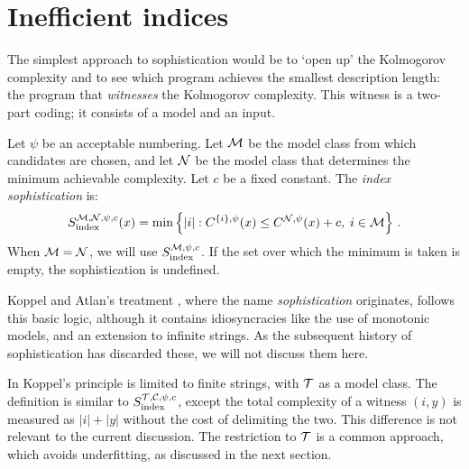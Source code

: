 \section{Inefficient indices}
\label{section:indices}

The simplest approach to sophistication would be to `open up' the Kolmogorov complexity and to see which program achieves the smallest description length: the program that \emph{witnesses} the Kolmogorov complexity. This witness is a two-part coding; it consists of a model and an input.


\begin{definition}
Let $\psi$ be an acceptable numbering. Let ${\cal M}$ be the model class from which candidates are chosen, and let ${\cal N}$ be the model class that determines the minimum achievable complexity. Let $c$ be a fixed constant. The \emph{index sophistication} is:
\[
S_{\textnormal{index}}^{{\cal M},{\cal N},\psi,c}(x) = \min\left\{ |i| : C^{\{i\}, \psi}(x) \leq C^{{\cal N}, \psi}(x)+c,\;i \in {\cal M}\right\} \,\text{.}
\]
When ${\cal M} = {\cal N}$, we will use $S_{\textnormal{index}}^{{\cal M},\psi,c}$. If the set over which the minimum is taken is empty, the sophistication is undefined.\label{definition:index}
\end{definition}
Koppel and Atlan's treatment \cite{koppelSoph1988,koppel1991almost}, where the name \emph{sophistication} originates, follows this basic logic, although it contains idiosyncracies like the use of monotonic models, and an extension to infinite strings. As the subsequent history of sophistication has discarded these, we will not discuss them here.


In \cite{antunes2009sophistication,antunes2013sophistication} Koppel's principle is limited to finite strings, with ${\cal T}$ as a model class. The definition is similar to $S_{\textnormal{index}}^{{\cal T}, {\cal C},\psi,c}$, except the total complexity of a witness $(i,y)$ is measured as $|i|+|y|$ without the cost of delimiting the two. This difference is not relevant to the current discussion. The restriction to ${\cal T}$ is a common approach, which avoids underfitting, as discussed in the next section.
 

